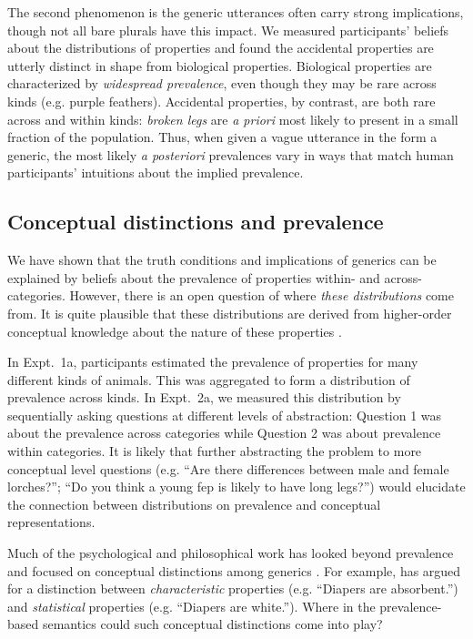 \documentclass[10pt,letterpaper]{article}
\begin{document}
The second phenomenon is the generic utterances often carry strong implications, though not all bare plurals have this impact. 
We measured participants' beliefs about the distributions of properties and found the accidental properties are utterly distinct in shape from biological properties.
Biological properties are characterized by \emph{widespread prevalence}, even though they may be rare across kinds (e.g. purple feathers).
Accidental properties, by contrast, are both rare across and within kinds: \emph{broken legs} are \emph{a priori} most likely to present in a small fraction of the population.
Thus, when given a vague utterance in the form a generic, the most likely \emph{a posteriori} prevalences vary in ways that match human participants' intuitions about the implied prevalence.


\subsection{Conceptual distinctions and prevalence}

We have shown that the truth conditions and implications of generics can be explained by beliefs about the prevalence of properties within- and across- categories. 
However, there is an open question of where \emph{these distributions} come from. 
It is quite plausible that these distributions are derived from higher-order conceptual knowledge about the nature of these properties \cite{Gelman2005, Keil1992}.

In Expt.~1a, participants estimated the prevalence of properties for many different kinds of animals. This was aggregated to form a distribution of prevalence across kinds.
In Expt.~2a, we measured this distribution by sequentially asking questions at different levels of abstraction: Question 1 was about the prevalence across categories while Question 2 was about prevalence within categories. 
It is likely that further abstracting the problem to more conceptual level questions (e.g. ``Are there differences between male and female lorches?''; ``Do you think a young fep is likely to have long legs?'') would elucidate the connection between distributions on prevalence and conceptual representations. 

Much of the psychological and philosophical work has looked beyond prevalence and focused on conceptual distinctions among generics \cite{Prasada2013, Leslie2008}. For example, \citeauthor{Prasada2013} has argued for a distinction between \emph{characteristic} properties (e.g. ``Diapers are absorbent.'') and \emph{statistical} properties (e.g. ``Diapers are white.''). Where in the prevalence-based semantics could such conceptual distinctions come into play?
\end{document}
